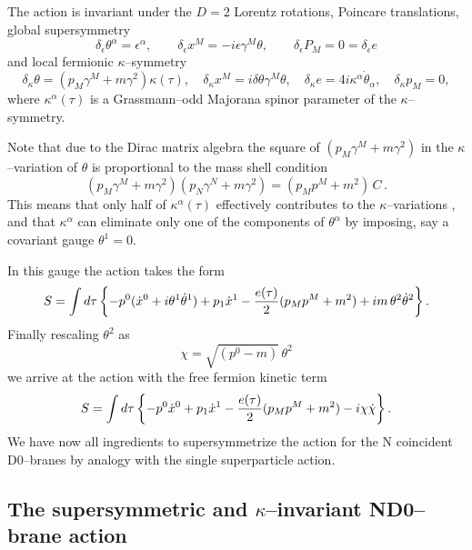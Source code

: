 \documentclass[a4paper,12pt]{article}
\begin{document}
The action  is invariant under the $D=2$ Lorentz rotations,
Poincare translations, global supersymmetry
\begin{equation}\label{21}
\delta_\epsilon\theta^\alpha=\epsilon^\alpha, \qquad \delta_\epsilon
x^M=-i\epsilon\gamma^M\theta,\qquad \delta_\epsilon
P_M=0=\delta_\epsilon e
\end{equation}
and local fermionic $\kappa$--symmetry
\begin{equation}\label{22}
\delta_\kappa\theta=(p_M\gamma^M+m\gamma^2)\kappa(\tau), \quad
\delta_\kappa
x^M=i\delta\theta\gamma^M\theta,\quad \delta_\kappa
e=4i\kappa^\alpha\dot\theta_\alpha, \quad \delta_\kappa p_M=0,
\end{equation}
where $\kappa^\alpha(\tau)$ is a Grassmann--odd Majorana spinor
parameter of the $\kappa$--symmetry.

Note that due to the Dirac matrix algebra the square of
$(p_M\gamma^M+m\gamma^2)$ in the
$\kappa$--variation of $\theta$ is proportional to the mass shell
condition
\begin{equation}\label{23}
(p_M\gamma^M+m\gamma^2)(p_N\gamma^N+m\gamma^2)=(p_Mp^M+m^2)\,C\,.
\end{equation}
This means that only half of $\kappa^\alpha(\tau)$ effectively
contributes to the $\kappa$--variations , and that
$\kappa^\alpha$ can eliminate only one of the components of
$\theta^\alpha$ by imposing, say a covariant gauge $\theta^1=0$.

In this gauge the action takes the form
\begin{equation}\label{24}
S=\int d\tau
\left\{-p^0(\dot x^0+i\theta^1\dot\theta^1)+p_1\dot x^1-{{e(\tau)}\over
2}(p_Mp^M+m^2)+ im\,\theta^2\dot\theta^2\right\}.
\end{equation}
Finally rescaling $\theta^2$ as
\begin{equation}\label{25}
\chi=\sqrt{(p^0-m)}\,\theta^2
\end{equation}
we arrive at the action with the free fermion kinetic term
\begin{equation}\label{26}
S=\int d\tau
\left\{-p^0\dot x^0+p_1\dot x^1-{{e(\tau)}\over
2}(p_Mp^M+m^2)- i\chi\dot\chi\right\}.
\end{equation}
We have now all ingredients to supersymmetrize the action for the
N coincident D0--branes by analogy with the single superparticle
action.

\subsection{The supersymmetric and $\kappa$--invariant ND0--brane action}
\end{document}
